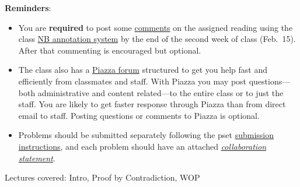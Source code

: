 \documentclass[handout]{mcs}
\begin{document}
\renewcommand{\reading}{
Part~\bref{part:proofs}{. \emph{Proofs:
      Introduction}}; Chapter~\bref{proofs_chap}{.\ \emph{What is a
      Proof?}}; Chapter~\bref{well_ordering_chap}{.\ \emph{The Well
      Ordering Principle}}.  These
  assigned readings do \textbf{not} include the Problem sections.  (Many
  of the problems in the text will appear as class or homework problems.)}


\medskip

\textbf{Reminders}:
\begin{itemize}
\item 
  You are \textbf{required} to post some
  \href{http://courses.csail.mit.edu/6.042/spring13/courseinfo#comments}{comments}
  on the assigned reading using the class
  \href{http://nb.csail.mit.edu}{NB annotation system} by the end of
  the second week of class (Feb.\ 15).  After that commenting is
  encouraged but optional.

\item The class also has a
  \href{http://piazza.com/mit/spring2013/6042j18062j/home}{Piazza
    forum} structured to get you help fast and efficiently from
  classmates and staff.  With Piazza you may post questions---both
  administrative and content related---to the entire class or to just
  the staff.  You are likely to get faster response through Piazza
  than from direct email to staff.  Posting questions or comments to
  Piazza is optional.

\item Problems should be submitted separately following the pset
  \href{http://courses.csail.mit.edu/6.042/spring13/submission.shtml}
       {submission instructions}, and each problem should have an attached
  \href{http://courses.csail.mit.edu/6.042/spring13/submission_template.pdf}
       {\emph{collaboration statement}}.

 \end{itemize}

\begin{staffnotes}
Lectures covered: Intro, Proof by Contradiction, WOP
\end{staffnotes}




\end{document}
